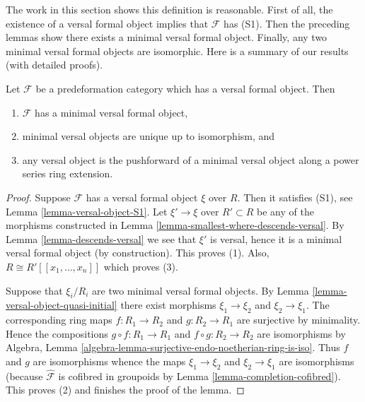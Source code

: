 \noindent
The work in this section shows this definition is reasonable.
First of all, the existence of a versal formal object implies that
$\mathcal{F}$ has (S1). Then the preceding lemmas
show there exists a minimal versal formal object. Finally, any
two minimal versal formal objects are isomorphic. Here is a summary
of our results (with detailed proofs).

\begin{lemma}
\label{lemma-minimal-versal}
Let $\mathcal{F}$ be a predeformation category which
has a versal formal object. Then
\begin{enumerate}
\item $\mathcal{F}$ has a minimal versal formal object,
\item minimal versal objects are unique up to isomorphism, and
\item any versal object is the pushforward of a minimal versal
object along a power series ring extension.
\end{enumerate}
\end{lemma}

\begin{proof}
Suppose $\mathcal{F}$ has a versal formal object $\xi$ over $R$.
Then it satisfies (S1), see
Lemma \ref{lemma-versal-object-S1}.
Let $\xi' \to \xi$ over $R' \subset R$ be any of the morphisms constructed in
Lemma \ref{lemma-smallest-where-descends-versal}.
By
Lemma \ref{lemma-descends-versal}
we see that $\xi'$ is versal, hence it is a minimal versal formal
object (by construction). This proves (1).
Also, $R \cong R'[[x_1, \ldots, x_n]]$ which proves (3).

\medskip\noindent
Suppose that $\xi_i/R_i$ are two minimal versal formal objects. By
Lemma \ref{lemma-versal-object-quasi-initial}
there exist morphisms $\xi_1 \to \xi_2$ and $\xi_2 \to \xi_1$.
The corresponding ring maps $f : R_1 \to R_2$ and $g : R_2 \to R_1$
are surjective by minimality. Hence the compositions
$g \circ f : R_1 \to R_1$ and $f \circ g : R_2 \to R_2$ are
isomorphisms by
Algebra, Lemma \ref{algebra-lemma-surjective-endo-noetherian-ring-is-iso}.
Thus $f$ and $g$ are isomorphisms whence the maps
$\xi_1 \to \xi_2$ and $\xi_2 \to \xi_1$ are isomorphisms
(because $\widehat{\mathcal{F}}$ is cofibred in groupoids by
Lemma \ref{lemma-completion-cofibred}). This proves (2) and
finishes the proof of the lemma.
\end{proof}








